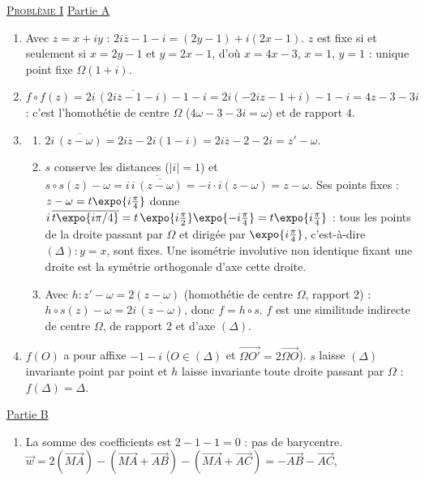 \begin{corrige}
\noindent \underline{\textsc{Probl\`eme I}} \newline
\underline{Partie A}
\begin{enumerate}
\item Avec $z = x + iy$ : $2i\overline{z} - 1 - i = (2y - 1) + i(2x - 1)$. $z$ est fixe si et seulement si $x = 2y - 1$ et $y = 2x - 1$,
      d'o\`u $x = 4x - 3$, $x = 1$, $y = 1$ : unique point fixe $\Omega(1 + i)$.
\item $f \circ f(z) = 2i\,\overline{(2i\overline{z} - 1 - i)} - 1 - i = 2i(-2iz - 1 + i) - 1 - i = 4z - 3 - 3i$ : c'est l'homoth\'etie de centre
      $\Omega$ ($4\omega - 3 - 3i = \omega$) et de rapport $4$.
\item \begin{enumerate}
      \item $2i\,\overline{(z - \omega)} = 2i\overline{z} - 2i(1 - i) = 2i\overline{z} - 2 - 2i = z' - \omega$.
      \item $s$ conserve les distances ($|i| = 1$) et $s \circ s(z) - \omega = i\,\overline{i\,\overline{(z - \omega)}} = -i \cdot i(z - \omega) = z - \omega$.
            Ses points fixes : $z - \omega = t\expo{i\frac{\pi}{4}}$ donne $i\,\overline{t\expo{i\pi/4}} = t\,\expo{i\frac{\pi}{2}}\expo{-i\frac{\pi}{4}} = t\expo{i\frac{\pi}{4}}$ :
            tous les points de la droite passant par $\Omega$ et dirig\'ee par $\expo{i\frac{\pi}{4}}$, c'est-\`a-dire $(\Delta) : y = x$, sont fixes.
            Une isom\'etrie involutive non identique fixant une droite est la sym\'etrie orthogonale d'axe cette droite.
      \item Avec $h : z' - \omega = 2(z - \omega)$ (homoth\'etie de centre $\Omega$, rapport 2) : $h \circ s(z) - \omega = 2i\,\overline{(z - \omega)}$, donc $f = h \circ s$.
            $f$ est une similitude indirecte de centre $\Omega$, de rapport 2 et d'axe $(\Delta)$.
      \end{enumerate}
\item $f(O)$ a pour affixe $-1 - i$ ($O \in (\Delta)$ et $\overrightarrow{\Omega O'} = 2\overrightarrow{\Omega O}$). $s$ laisse $(\Delta)$ invariante point par point et
      $h$ laisse invariante toute droite passant par $\Omega$ : $f(\Delta) = \Delta$.
\end{enumerate}
\underline{Partie B}
\begin{enumerate}
\item La somme des coefficients est $2 - 1 - 1 = 0$ : pas de barycentre.
      $\vec{w} = 2(\overrightarrow{MA}) - (\overrightarrow{MA} + \overrightarrow{AB}) - (\overrightarrow{MA} + \overrightarrow{AC}) = -\overrightarrow{AB} - \overrightarrow{AC}$,

\end{enumerate}
\end{corrige}
